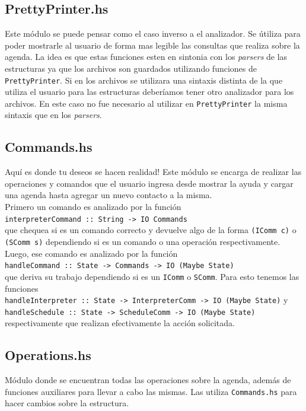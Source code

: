 \documentclass[a4paper,12pt]{article}
\begin{document}
       \subsection*{PrettyPrinter.hs}
       Este módulo se puede pensar como el caso inverso a el analizador. Se útiliza para poder mostrarle al usuario de forma mas legible 
       las consultas que realiza sobre la agenda.
       La idea es que estas funciones esten en sintonia con los \textit{parsers} de las estructuras ya que los archivos son guardados 
       utilizando funciones de \texttt{PrettyPrinter}. Si en los archivos se utilizara una sintaxis distinta de la que utiliza 
       el usuario para las estructuras deberíamos tener otro analizador para los archivos. En este caso no fue necesario al utilizar en 
       \texttt{PrettyPrinter} la misma sintaxis que en los \textit{parsers}. 

       \subsection*{Commands.hs}
       Aquí es donde tu deseos se hacen realidad! Este módulo se encarga de realizar las operaciones y comandos que el usuario ingresa desde mostrar la ayuda y cargar una agenda hasta agregar un nuevo contacto a la misma.\\
       Primero un comando es analizado por la función\\
       \texttt{interpreterCommand :: String -> IO Commands}\\
       que chequea si es un comando correcto y devuelve algo de la forma \texttt{(IComm c)} o \texttt{(SComm
       s)} dependiendo si es un comando o una operación respectivamente.\\
       Luego, ese comando es analizado por la función\\
       \texttt{handleCommand :: State -> Commands -> IO (Maybe State)}\\
        que deriva su trabajo dependiendo si es un \texttt{IComm} o \texttt{SComm}. Para esto
        tenemos las funciones
        \\ \texttt{handleInterpreter :: State -> InterpreterComm -> IO (Maybe State)} y \\
        \texttt{handleSchedule ::  State -> ScheduleComm -> IO (Maybe State)} respectivamente que realizan efectivamente la acción solicitada.

        \subsection*{Operations.hs}
        Módulo donde se encuentran todas las operaciones sobre la agenda, además de funciones auxiliares para llevar a cabo las mismas. Las utiliza \texttt{Commands.hs} para hacer cambios sobre la estructura.
\end{document}
